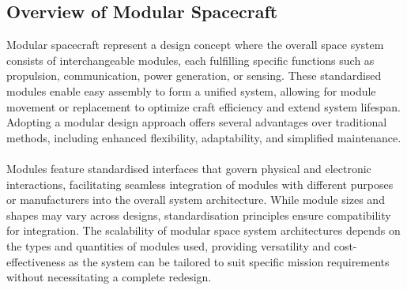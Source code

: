 \subsection{Overview of Modular Spacecraft}
Modular spacecraft represent a design concept where the overall space system consists of interchangeable modules, each fulfilling specific functions such as propulsion, communication, power generation, or sensing. These standardised modules enable easy assembly to form a unified system, allowing for module movement or replacement to optimize craft efficiency and extend system lifespan. Adopting a modular design approach offers several advantages over traditional methods, including enhanced flexibility, adaptability, and simplified maintenance.
\\\\
Modules feature standardised interfaces that govern physical and electronic interactions, facilitating seamless integration of modules with different purposes or manufacturers into the overall system architecture. While module sizes and shapes may vary across designs, standardisation principles ensure compatibility for integration. The scalability of modular space system architectures depends on the types and quantities of modules used, providing versatility and cost-effectiveness as the system can be tailored to suit specific mission requirements without necessitating a complete redesign.
